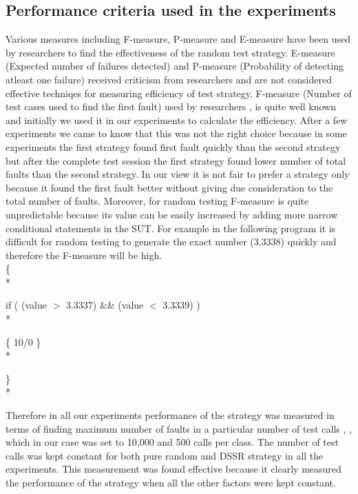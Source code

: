 \subsection{Performance criteria used in the experiments}
Various measures including F-measure, P-measure and E-measure have been used by researchers to find the effectiveness of the random test strategy. E-measure (Expected number of failures detected) and P-measure (Probability of detecting atleast one failure) received criticism from researchers \cite{Chen2008} and are not considered effective techniqes for measuring efficiency of test strategy. F-measure (Number of test cases used to find the first fault) used by researchers  \cite{Chen1996}, \cite{Chen2004} is quite well known and initially we used it in our experiments to calculate the efficiency. After a few experiments we came to know that this was not the right choice because in some experiments the first strategy found first fault quickly than the second strategy but after the complete test session the first strategy found lower number of total faults than the second strategy. In our view it is not fair to prefer a strategy only because it found the first fault better without giving due consideration to the total number of faults. Moreover, for random testing F-measure is quite unpredictable because its value can be easily increased by adding more narrow conditional statements in the SUT. For example in the following program it is difficult for random testing to generate the exact number (3.3338) quickly and therefore the F-measure will be high.\\

\{ \\*   

\hspace{07 mm}if ( (value $>$  3.3337) \&\& (value $<$ 3.3339) )\\*

\hspace{07 mm}\{ 10/0 \} \\* 

\} \\*

Therefore in all our experiments performance of the strategy was measured in terms of finding maximum number of faults in a particular number of test calls  \cite{Ciupa2007}, \cite{Pacheco2007a}, \cite{Ciupa2008b} which in our case was set to 10,000 and 500 calls per class. The number of test calls was kept constant for both pure random and DSSR strategy in all the experiments. This measurement was found effective because it clearly measured the performance of the strategy when all the other factors were kept constant.\\


